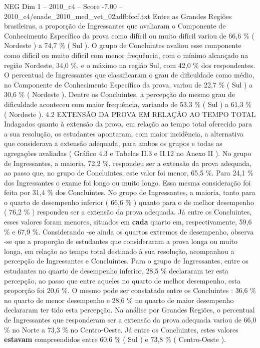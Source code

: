 \begin{textsample}{NEG Dim 1 – 2010\_c4 – Score -7.00 – 2010\_c4/enade\_2010\_med\_vet\_02adfbfccf.txt}
Entre as Grandes Regiões brasileiras, a proporção de Ingressantes que avaliaram o Componente de Conhecimento Específico da prova como difícil ou muito difícil variou de 66,6 \% ( Nordeste ) a 74,7 \% ( Sul ).
O grupo de Concluintes avaliou esse componente como difícil ou muito difícil com menor frequência, com o mínimo alcançado na região Nordeste, 34,0 \%, e o máximo na região Sul, com 42,0 \% dos respondentes.
O percentual de Ingressantes que classificaram o grau de dificuldade como médio, no Componente de Conhecimento Específico da prova, variou de 22,7 \% ( Sul ) a 30,6 \% ( Nordeste ).
Dentre os Concluintes, a percepção do mesmo grau de dificuldade aconteceu com maior frequência, variando de 53,3 \% ( Sul ) a 61,3 \% ( Nordeste ). 4.2 EXTENSÃO DA PROVA EM RELAÇÃO AO TEMPO TOTAL Indagados quanto à extensão da prova, em relação ao tempo total oferecido para a sua resolução, os estudantes apontaram, com maior incidência, a alternativa que considerava a extensão adequada, para ambos os grupos e todas as agregações avaliadas ( Gráfico 4.3 e Tabelas II.3 e II.12 no Anexo II ).
No grupo de Ingressantes, a maioria, 72,2 \%, respondeu ser a extensão da prova adequada, ao passo que, no grupo de Concluintes, este valor foi menor, 65,5 \%.
Para 24,1 \% dos Ingressantes o exame foi longo ou muito longo.
Essa mesma consideração foi feita por 31,4 \% dos Concluintes.
No grupo de Ingressantes, a maioria, tanto para o quarto de desempenho inferior ( 66,6 \% ) quanto para o de melhor desempenho ( 76,2 \% ) respondeu ser a extensão da prova adequada.
Já entre os Concluintes, esses valores foram menores, situados em \textbf{cada} quarto em, respectivamente, 59,6 \% e 67,9 \%.
Considerando -se ainda os quartos extremos de desempenho, observa -se que a proporção de estudantes que consideraram a prova longa ou muito longa, em relação ao tempo total destinado à sua resolução, acompanhou a percepção de Ingressantes e Concluintes.
Para o grupo de Ingressantes, entre os estudantes no quarto de desempenho inferior, 28,5 \% declararam ter esta percepção, ao passo que entre aqueles no quarto de melhor desempenho, esta proporção foi 20,6 \%.
O mesmo pode ser constatado entre os Concluintes : 36,6 \% no quarto de menor desempenho e 28,6 \% no quarto de maior desempenho declararam ter tido esta percepção.
Na análise por Grandes Regiões, o percentual de Ingressantes que responderam ser a extensão da prova adequada variou de 66,0 \% no Norte a 73,3 \% no Centro-Oeste.
Já entre os Concluintes, estes valores \textbf{estavam} compreendidos entre 60,6 \% ( Sul ) e 73,8 \% ( Centro-Oeste ).

\end{textsample}
